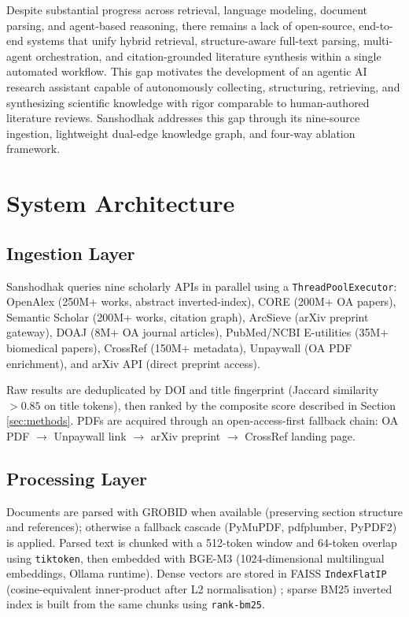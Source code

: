 \documentclass[conference,10pt,twocolumn]{IEEEtran}
\begin{document}
Despite substantial progress across retrieval, language modeling, document parsing, and agent-based reasoning, there remains a lack of open-source, end-to-end systems that unify hybrid retrieval, structure-aware full-text parsing, multi-agent orchestration, and citation-grounded literature synthesis within a single automated workflow. This gap motivates the development of an agentic AI research assistant capable of autonomously collecting, structuring, retrieving, and synthesizing scientific knowledge with rigor comparable to human-authored literature reviews. Sanshodhak addresses this gap through its nine-source ingestion, lightweight dual-edge knowledge graph, and four-way ablation framework.

\section{System Architecture}
\label{sec:arch}

\subsection{Ingestion Layer}

Sanshodhak queries nine scholarly APIs in parallel using a \texttt{ThreadPoolExecutor}: OpenAlex (250M+ works, abstract inverted-index), CORE (200M+ OA papers), Semantic Scholar (200M+ works, citation graph), ArcSieve (arXiv preprint gateway), DOAJ (8M+ OA journal articles), PubMed/NCBI E-utilities (35M+ biomedical papers), CrossRef (150M+ metadata), Unpaywall (OA PDF enrichment), and arXiv API (direct preprint access).

Raw results are deduplicated by DOI and title fingerprint (Jaccard similarity $> 0.85$ on title tokens), then ranked by the composite score described in Section \ref{sec:methods}. PDFs are acquired through an open-access-first fallback chain: OA PDF $\to$ Unpaywall link $\to$ arXiv preprint $\to$ CrossRef landing page.

\subsection{Processing Layer}

Documents are parsed with GROBID \cite{lopez2009grobid} when available (preserving section structure and references); otherwise a fallback cascade (PyMuPDF, pdfplumber, PyPDF2) is applied. Parsed text is chunked with a 512-token window and 64-token overlap using \texttt{tiktoken}, then embedded with BGE-M3 (1024-dimensional multilingual embeddings, Ollama runtime). Dense vectors are stored in FAISS \texttt{IndexFlatIP} (cosine-equivalent inner-product after L2 normalisation) \cite{johnson2021faiss}; sparse BM25 inverted index is built from the same chunks using \texttt{rank-bm25}.
\end{document}
